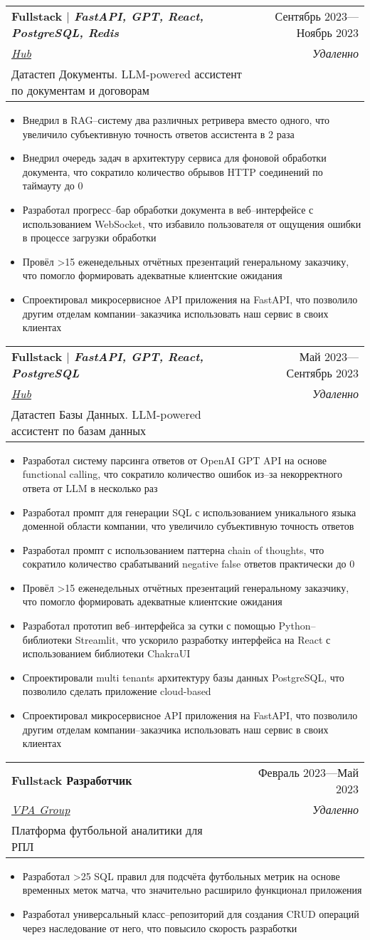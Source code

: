 \documentclass[letterpaper,11pt]{article}
\makeatletter
\newcommand{\resumeItem}[1]{
  \item\small{
    {#1 \vspace{-2pt}}
  }
}
\newcommand{\resumeSubheading}[5]{
  \vspace{-2pt}\item
    \begin{tabular*}{0.97\textwidth}[t]{l@{\extracolsep{\fill}}r}
      \textbf{#1} & #2 \\
      \textit{\small#3} & \textit{\small #4} \\
      \small#5
    \end{tabular*}\vspace{-7pt}
}
\newcommand{\resumeItemListStart}{\begin{itemize}}
\newcommand{\resumeItemListEnd}{\end{itemize}\vspace{-5pt}}
\makeatother
\begin{document}
    \resumeSubheading
      {\textbf{Fullstack} $|$ \emph{FastAPI, GPT, React, PostgreSQL, Redis}}{Сентябрь 2023—Ноябрь 2023}
      {\href{https://t.me/abouthub}{\underline{Hub}}}{Удаленно}
      {Датастеп Документы. LLM-powered ассистент по документам и договорам}
      \resumeItemListStart
        \resumeItem{Внедрил в RAG–систему два различных ретривера вместо одного, что увеличило субъективную точность ответов ассистента в 2 раза}
        \resumeItem{Внедрил очередь задач в архитектуру сервиса для фоновой обработки документа, что сократило количество обрывов HTTP соединений по таймауту до 0}
        \resumeItem{Разработал прогресс–бар обработки документа в веб–интерфейсе с использованием WebSocket, что избавило пользователя от ощущения ошибки в процессе загрузки обработки}
        \resumeItem{Провёл >15 еженедельных отчётных презентаций генеральному заказчику, что помогло формировать адекватные клиентские ожидания}
        \resumeItem{Спроектировал микросервисное API приложения на FastAPI, что позволило другим отделам компании–заказчика использовать наш сервис в своих клиентах}
      \resumeItemListEnd

\resumeSubheading
  {\textbf{Fullstack} $|$ \emph{FastAPI, GPT, React, PostgreSQL}}{Май 2023—Сентябрь 2023}
  {\href{https://t.me/abouthub}{\underline{Hub}}}{Удаленно}
  {Датастеп Базы Данных. LLM-powered ассистент по базам данных}
  \resumeItemListStart
    \resumeItem{Разработал систему парсинга ответов от OpenAI GPT API на основе functional calling, что сократило количество ошибок из–за некорректного ответа от LLM в несколько раз}
    \resumeItem{Разработал промпт для генерации SQL с использованием уникального языка доменной области компании, что увеличило субъективную точность ответов}
    \resumeItem{Разработал промпт с использованием паттерна chain of thoughts, что сократило количество срабатываний negative false ответов практически до 0}
    \resumeItem{Провёл >15 еженедельных отчётных презентаций генеральному заказчику, что помогло формировать адекватные клиентские ожидания}
    \resumeItem{Разработал прототип веб–интерфейса за сутки с помощью Python–библиотеки Streamlit, что ускорило разработку интерфейса на React с использованием библиотеки ChakraUI}
    \resumeItem{Спроектировали multi tenants архитектуру базы данных PostgreSQL, что позволило сделать приложение cloud-based}
    \resumeItem{Спроектировал микросервисное API приложения на FastAPI, что позволило другим отделам компании–заказчика использовать наш сервис в своих клиентах}
  \resumeItemListEnd

  \resumeSubheading
      {Fullstack Разработчик}{Февраль 2023—Май 2023}
      {\href{https://vpa.group}{\underline{VPA Group}}}{Удаленно}
      {Платформа футбольной аналитики для РПЛ}
      \resumeItemListStart
        \resumeItem{Разработал >25 SQL правил для подсчёта футбольных метрик на основе временных меток матча, что значительно расширило функционал приложения}
        \resumeItem{Разработал универсальный класс–репозиторий для создания CRUD операций через наследование от него, что повысило скорость разработки}
      \resumeItemListEnd
\end{document}
